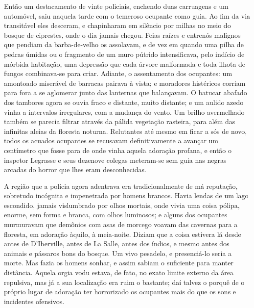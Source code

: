 \begin{pages}
\begin{Rightside}
Então um destacamento de vinte policiais, enchendo duas carruagens e um
automóvel, saiu naquela tarde com o temeroso ocupante como guia. Ao fim
da via transitável eles desceram, e chapinharam em silêncio por milhas
no meio do bosque de ciprestes, onde o dia jamais chegou. Feias raízes e
entrenós malignos que pendiam da barba-de-velho os assolavam, e de vez
em quando uma pilha de pedras úmidas ou o fragmento de um muro pútrido
intensificava, pelo indício de mórbida habitação, uma depressão que cada
árvore malformada e toda ilhota de fungos combinava-se para criar.
Adiante, o assentamento dos ocupantes: um amontoado miserável de
barracas pairava à vista; e moradores histéricos corriam para fora a se
aglomerar junto das lanternas que balançavam. O batucar abafado dos
tambores agora se ouvia fraco e distante, muito distante; e um aulido
azedo vinha a intervalos irregulares, com a mudança do vento. Um brilho
avermelhado também se parecia filtrar através da pálida vegetação
rasteira, para além das infinitas aleias da floresta noturna. Relutantes
até mesmo em ficar a sós de novo, todos os acuados ocupantes se
recusavam definitivamente a avançar um centímetro que fosse para de onde
vinha aquela adoração profana, e então o inspetor Legrasse e seus
dezenove colegas meteram-se sem guia nas negras arcadas do horror que
lhes eram desconhecidas.

A região que a polícia agora adentrava era tradicionalmente de má
reputação, sobretudo incógnita e impenetrada por homens brancos. Havia
lendas de um lago escondido, jamais vislumbrado por olhos mortais, onde
vivia uma coisa pólipa, enorme, sem forma e branca, com olhos luminosos;
e alguns dos ocupantes murmuravam que demônios com asas de morcego
voavam das cavernas para a floresta, em adoração àquilo, à meia-noite.
Diziam que a coisa estivera lá desde antes de D'Iberville, antes de La
Salle, antes dos índios, e mesmo antes
dos animais e pássaros bons do bosque. Um vivo pesadelo, e presenciá-lo
seria a morte. Mas fazia os homens sonhar, e assim sabiam o suficiente
para manter distância. Aquela orgia vodu estava, de fato, no exato
limite externo da área repulsiva, mas já a sua localização era ruim o
bastante; daí talvez o porquê de o próprio lugar de adoração ter
horrorizado os ocupantes mais do que os sons e incidentes ofensivos.


\end{Rightside}
\end{pages}
